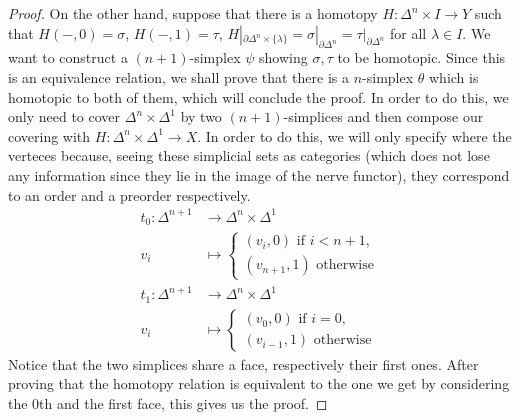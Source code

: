 \documentclass[a4paper,11pt,openany]{scrartcl}
\begin{document}
\begin{proof}
    On the other hand, suppose that there is a homotopy $H\colon\Delta^n\times
    I\rightarrow Y$ such that $H(-,0)=\sigma$, $H(-,1)=\tau$,
    $H|_{\partial\Delta^n\times\{\lambda\}}=\sigma|_{\partial\Delta^n}=\tau|_{\partial\Delta^n}$
    for all $\lambda\in I$.
    We want to construct a $(n+1)$-simplex $\psi$ showing $\sigma,\tau$ to be
    homotopic. Since this is an equivalence relation, we shall prove that there
    is a $n$-simplex $\theta$ which is homotopic to both of them, which will
    conclude the proof. In order to do this, we only need to cover
    $\Delta^n\times\Delta^1$ by two $(n+1)$-simplices and then compose our covering with
    $H\colon\Delta^n\times\Delta^1\rightarrow X$. In order to do this, we
    will only specify where the verteces because, seeing these simplicial sets
    as categories (which does not lose any information since they lie in the
    image of the nerve functor), they correspond to an order and a preorder
    respectively.
    \begin{align*}
        t_0\colon\Delta^{n+1}&\rightarrow\Delta^n\times\Delta^1 \\
        v_i &\mapsto\begin{cases}
                        (v_i,0)\text{ if $i<n+1$,} \\
                        (v_{n+1},1)\text{ otherwise}
                    \end{cases} \\
        t_1\colon\Delta^{n+1}&\rightarrow\Delta^n\times\Delta^1 \\
        v_i &\mapsto\begin{cases}
                        (v_0,0)\text{ if $i=0$,} \\
                        (v_{i-1},1)\text{ otherwise}
                    \end{cases}
    \end{align*}
    Notice that the two simplices share a face, respectively their first ones.
    After proving that the homotopy relation is equivalent to the one we get by
    considering the $0$th and the first face, this gives us the proof.
\end{proof}
\end{document}
